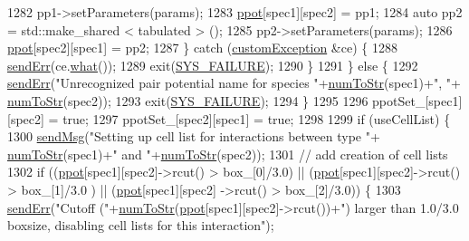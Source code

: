 \begin{DoxyCode}
1282             pp1->setParameters(params);
1283             \hyperlink{classsim_system_ad2e290b5963f132e6a3a56cee35c8e9f}{ppot}[spec1][spec2] = pp1;
1284             \textcolor{keyword}{auto} pp2 = std::make\_shared < tabulated > ();
1285             pp2->setParameters(params);
1286             \hyperlink{classsim_system_ad2e290b5963f132e6a3a56cee35c8e9f}{ppot}[spec2][spec1] = pp2;
1287         \} \textcolor{keywordflow}{catch} (\hyperlink{classcustom_exception}{customException} &ce) \{
1288             \hyperlink{utilities_8cpp_a6dacf3c3c19aa1e13a4d5a148fe5114e}{sendErr}(ce.\hyperlink{classcustom_exception_aeb6ab5848b038adfc68fde86a512f691}{what}());
1289             exit(\hyperlink{global_8h_a428dfe1ef0a6ff4b1fdebf275f6aff2e}{SYS\_FAILURE});
1290         \}
1291     \} \textcolor{keywordflow}{else} \{
1292         \hyperlink{utilities_8cpp_a6dacf3c3c19aa1e13a4d5a148fe5114e}{sendErr}(\textcolor{stringliteral}{"Unrecognized pair potential name for species "}+\hyperlink{utilities_8h_ae6ed8fadf719af789711a7c0e99f44bc}{numToStr}(spec1)+\textcolor{stringliteral}{", "}+
      \hyperlink{utilities_8h_ae6ed8fadf719af789711a7c0e99f44bc}{numToStr}(spec2));
1293         exit(\hyperlink{global_8h_a428dfe1ef0a6ff4b1fdebf275f6aff2e}{SYS\_FAILURE});
1294     \}
1295 
1296     ppotSet\_[spec1][spec2] = \textcolor{keyword}{true};
1297     ppotSet\_[spec2][spec1] = \textcolor{keyword}{true};
1298 
1299     \textcolor{keywordflow}{if} (useCellList) \{
1300         \hyperlink{utilities_8cpp_a08974c73a5b36c28b8ad1ef47fca77b0}{sendMsg}(\textcolor{stringliteral}{"Setting up cell list for interactions between type "}+
      \hyperlink{utilities_8h_ae6ed8fadf719af789711a7c0e99f44bc}{numToStr}(spec1)+\textcolor{stringliteral}{" and "}+\hyperlink{utilities_8h_ae6ed8fadf719af789711a7c0e99f44bc}{numToStr}(spec2));
1301         \textcolor{comment}{// add creation of cell lists}
1302         \textcolor{keywordflow}{if} ((\hyperlink{classsim_system_ad2e290b5963f132e6a3a56cee35c8e9f}{ppot}[spec1][spec2]->rcut() > box\_[0]/3.0) || (\hyperlink{classsim_system_ad2e290b5963f132e6a3a56cee35c8e9f}{ppot}[spec1][spec2]->rcut() > box\_[1]/3.0
      ) || (\hyperlink{classsim_system_ad2e290b5963f132e6a3a56cee35c8e9f}{ppot}[spec1][spec2] ->rcut() > box\_[2]/3.0)) \{
1303             \hyperlink{utilities_8cpp_a6dacf3c3c19aa1e13a4d5a148fe5114e}{sendErr}(\textcolor{stringliteral}{"Cutoff ("}+\hyperlink{utilities_8h_ae6ed8fadf719af789711a7c0e99f44bc}{numToStr}(\hyperlink{classsim_system_ad2e290b5963f132e6a3a56cee35c8e9f}{ppot}[spec1][spec2]->rcut())+\textcolor{stringliteral}{") larger than
       1.0/3.0 boxsize, disabling cell lists for this interaction"});

\end{DoxyCode}
